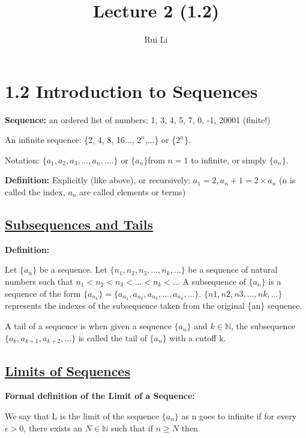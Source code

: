 \documentclass[11pt]{article}
\title{Lecture 2 (1.2)}
\author{Rui Li}
\begin{document}
\maketitle
\tableofcontents
\section*{1.2 Introduction to Sequences}
\textbf{Sequence: }an ordered list of numbers:
1, 3, 4, 5, 7, 0, -1, 20001 (finite!)
\medskip

An infinite sequence: \{2, 4, 8, 16..., $2^n$,...\} or \{$2^n$\}.

Notation: $\{a_1, a_2, a_3,...,a_n,....\}$ or $\{a_n\}$from $n=1$ to infinite, or simply $\{a_n\}$.
\bigskip

\textbf{Definition: } Explicitly (like above), or recursively:
$a_1 = 2, a_n+1 = 2\times a_n$ (n is called the index, $a_n$ are called elements or terms)

\subsection*{\underline{Subsequences and Tails}}

\textbf{Definition: }

Let $\{a_n\}$ be a sequence. Let $\{n_1, n_2, n_3,...,n_k,...\}$ be a sequence of natural numbers such that $n_1 < n_2 < n_3 < ... < n_k < ...$ A subsequence of $\{a_n\}$ is a sequence of the form $\{a_{n_k}\} = \{a_{n_1}, a_{n_2}, a_{n_3},...,a_{n_k},...\}$. $\{n1, n2, n3,...,nk,...\}$ represents the indexes of the subsequence taken from the original \{an\} sequence.
\bigskip

A tail of a sequence is when given a sequence $\{a_n\}$ and $k \in \mathbb{N}$, the subsequence $\{a_k, a_{k+1}, a_{k+2},...\}$ is called the tail of $\{a_n\}$ with a cutoff k.

\subsection*{\underline{Limits of Sequences}}

\textbf{Formal definition of the Limit of a Sequence:}

We say that L is the limit of the sequence $\{a_n\}$ as n goes to infinite if for every $\epsilon > 0$, there exists an $N \in \mathbb{N}$ such that if $n \geq N$ then
\end{document}
